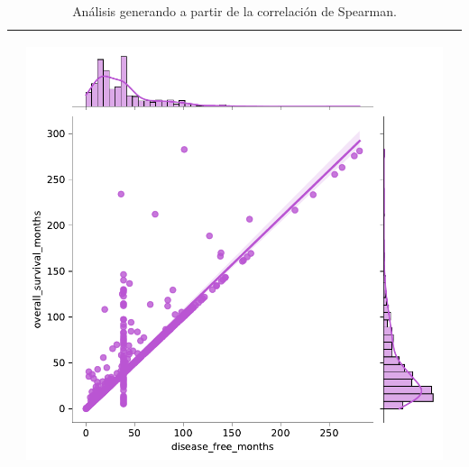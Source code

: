\begin{table}[htb!]
\begin{threeparttable}
\begin{tabular}{p{0.5cm} p{7cm} p{6.5cm}}
			& \begin{center}\includegraphics[width=1\linewidth]{NOTEBOOK/IMAGENES_CORRELACION/reg_disease_free_months_overall_survival_months}\end{center}
			\\ \hline
		\end{tabular}
			\caption{Análisis generando a partir de la correlación de Spearman.}
			\label{analisis_correlacion}
	\end{threeparttable}
\end{table}